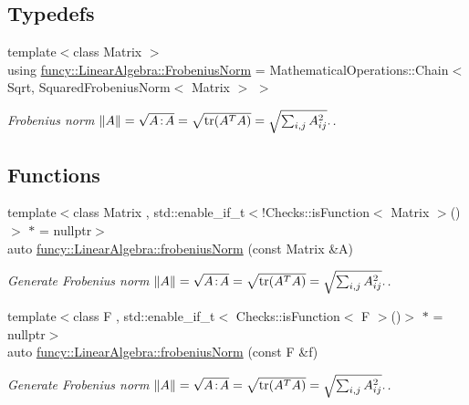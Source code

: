 \subsection*{Typedefs}
\begin{DoxyCompactItemize}
\item 
{\footnotesize template$<$class Matrix $>$ }\\using \hyperlink{group__LinearAlgebraGroup_ga38eae956615afce1e62bbd7c465688b4}{funcy\-::\-Linear\-Algebra\-::\-Frobenius\-Norm} = Mathematical\-Operations\-::\-Chain$<$ Sqrt, Squared\-Frobenius\-Norm$<$ Matrix $>$ $>$
\begin{DoxyCompactList}\small\item\em Frobenius norm $ \|A\| = \sqrt{A\negthinspace : \negthinspace A }= \sqrt{\mathrm{tr}(A^TA)} = \sqrt{\sum_{i,j} A_{ij}^2}. $. \end{DoxyCompactList}\end{DoxyCompactItemize}
\subsection*{Functions}
\begin{DoxyCompactItemize}
\item 
{\footnotesize template$<$class Matrix , std\-::enable\-\_\-if\-\_\-t$<$!\-Checks\-::is\-Function$<$ Matrix $>$()$>$ $\ast$  = nullptr$>$ }\\auto \hyperlink{group__LinearAlgebraGroup_gadd3d66efe1da1c662ef080bfe25fa2b6}{funcy\-::\-Linear\-Algebra\-::frobenius\-Norm} (const Matrix \&A)
\begin{DoxyCompactList}\small\item\em Generate Frobenius norm $ \|A\| = \sqrt{A\negthinspace : \negthinspace A }= \sqrt{\mathrm{tr}(A^TA)} = \sqrt{\sum_{i,j} A_{ij}^2}. $. \end{DoxyCompactList}\item 
{\footnotesize template$<$class F , std\-::enable\-\_\-if\-\_\-t$<$ Checks\-::is\-Function$<$ F $>$()$>$ $\ast$  = nullptr$>$ }\\auto \hyperlink{group__LinearAlgebraGroup_ga65a04179c8ede922ff74470f7ad15a8d}{funcy\-::\-Linear\-Algebra\-::frobenius\-Norm} (const F \&f)
\begin{DoxyCompactList}\small\item\em Generate Frobenius norm $ \|A\| = \sqrt{A\negthinspace : \negthinspace A }= \sqrt{\mathrm{tr}(A^TA)} = \sqrt{\sum_{i,j} A_{ij}^2}. $. \end{DoxyCompactList}\end{DoxyCompactItemize}
